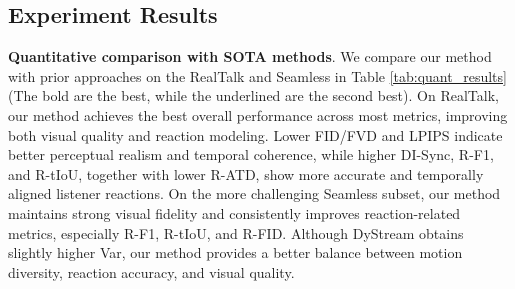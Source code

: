 \subsection{Experiment Results}

\textbf{Quantitative comparison with SOTA methods}. We compare our method with prior approaches on the RealTalk and Seamless in Table \ref{tab:quant_results} (The bold are the best, while the underlined are the second best). On RealTalk, our method achieves the best overall performance across most metrics, improving both visual quality and reaction modeling. Lower FID/FVD and LPIPS indicate better perceptual realism and temporal coherence, while higher DI-Sync, R-F1, and R-tIoU, together with lower R-ATD, show more accurate and temporally aligned listener reactions. On the more challenging Seamless subset, our method maintains strong visual fidelity and consistently improves reaction-related metrics, especially R-F1, R-tIoU, and R-FID. Although DyStream obtains slightly higher Var, our method provides a better balance between motion diversity, reaction accuracy, and visual quality.



